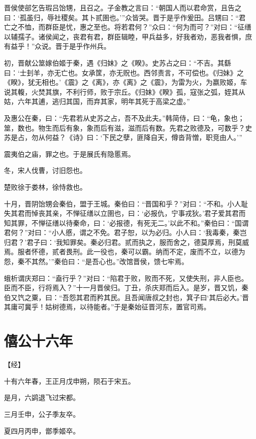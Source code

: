\documentclass[a4paper,12pt,UTF8,twoside]{ctexbook}
\begin{document}
晋侯使郤乞告瑕吕饴甥，且召之。子金教之言曰：“朝国人而以君命赏，且告之曰：‘孤虽归，辱社稷矣。其卜贰圉也。’”众皆哭。晋于是乎作爰田。吕甥曰：“君亡之不恤，而群臣是忧，惠之至也。将若君何？”众曰：“何为而可？”对曰：“征缮以辅孺子。诸侯闻之，丧君有君，群臣辑睦，甲兵益多，好我者劝，恶我者惧，庶有益乎！”众说。晋于是乎作州兵。

初，晋献公筮嫁伯姬于秦，遇《归妹》之《睽》。史苏占之曰：“不吉。其繇曰：‘士刲羊，亦无亡也。女承筐，亦无贶也。西邻责言，不可偿也。《归妹》之《睽》，犹无相也。’《震》之《离》，亦《离》之《震》，为雷为火，为嬴败姬，车说其輹，火焚其旗，不利行师，败于宗丘。《归妹》《睽》孤，寇张之弧，姪其从姑，六年其逋，逃归其国，而弃其家，明年其死于高梁之虚。”

及惠公在秦，曰：“先君若从史苏之占，吾不及此夫。”韩简侍，曰：“龟，象也；筮，数也。物生而后有象，象而后有滋，滋而后有数。先君之败德及，可数乎？史苏是占，勿从何益？《诗》曰：‘下民之孽，匪降自天，僔沓背憎，职竞由人。’”

震夷伯之庙，罪之也。于是展氏有隐慝焉。

冬，宋人伐曹，讨旧怨也。

楚败徐于娄林，徐恃救也。

十月，晋阴饴甥会秦伯，盟于王城。秦伯曰：“晋国和乎？”对曰：“不和。小人耻失其君而悼丧其亲，不惮征缮以立圉也，曰：‘必报仇，宁事戎狄。’君子爱其君而知其罪，不惮征缮以待秦命，曰：‘必报德，有死无二。’以此不和。”秦伯曰：“国谓君何？”对曰：“小人慼，谓之不免。君子恕，以为必归。小人曰：‘我毒秦，秦岂归君？’君子曰：‘我知罪矣。秦必归君。贰而执之，服而舍之，德莫厚焉，刑莫威焉。服者怀德，贰者畏刑。此一役也，秦可以霸。纳而不定，废而不立，以德为怨，秦不其然。’”秦伯曰：“是吾心也。”改馆晋侯，馈七牢焉。

蛾析谓庆郑曰：“盍行乎？”对曰：“陷君于败，败而不死，又使失刑，非人臣也。臣而不臣，行将焉入？”十一月晋侯归。丁丑，杀庆郑而后入。是岁，晋又饥，秦伯又饩之粟，曰：“吾怨其君而矜其民。且吾闻唐叔之封也，箕子曰‘其后必大。’晋其庸可冀乎！姑树德焉，以待能者。”于是秦始征晋河东，置官司焉。

\chapter{僖公十六年}



【经】

十有六年春，王正月戊申朔，陨石于宋五。

是月，六鹢退飞过宋都。

三月壬申，公子季友卒。

夏四月丙申，鄫季姬卒。
\end{document}
